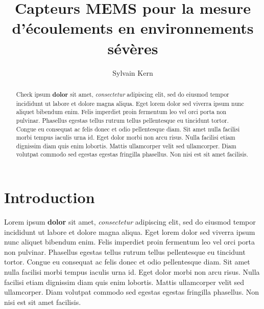 \documentclass[
]{article}
\title{Capteurs MEMS pour la mesure d'écoulements en environnements
sévères}
\author{Sylvain Kern}
\date{}
\begin{document}
\maketitle
\begin{abstract}
Check ipsum \textbf{dolor} sit amet, \emph{consectetur} adipiscing elit,
sed do eiusmod tempor incididunt ut labore et dolore magna aliqua. Eget
lorem dolor sed viverra ipsum nunc aliquet bibendum enim. Felis
imperdiet proin fermentum leo vel orci porta non pulvinar. Phasellus
egestas tellus rutrum tellus pellentesque eu tincidunt tortor. Congue eu
consequat ac felis donec et odio pellentesque diam. Sit amet nulla
facilisi morbi tempus iaculis urna id. Eget dolor morbi non arcu risus.
Nulla facilisi etiam dignissim diam quis enim lobortis. Mattis
ullamcorper velit sed ullamcorper. Diam volutpat commodo sed egestas
egestas fringilla phasellus. Non nisi est sit amet facilisis.
\end{abstract}

\section*{Introduction}\label{introduction}

Lorem ipsum \textbf{dolor} sit amet, \emph{consectetur} adipiscing elit,
sed do eiusmod tempor incididunt ut labore et dolore magna aliqua. Eget
lorem dolor sed viverra ipsum nunc aliquet bibendum enim. Felis
imperdiet proin fermentum leo vel orci porta non pulvinar. Phasellus
egestas tellus rutrum tellus pellentesque eu tincidunt tortor. Congue eu
consequat ac felis donec et odio pellentesque diam. Sit amet nulla
facilisi morbi tempus iaculis urna id. Eget dolor morbi non arcu risus.
Nulla facilisi etiam dignissim diam quis enim lobortis. Mattis
ullamcorper velit sed ullamcorper. Diam volutpat commodo sed egestas
egestas fringilla phasellus. Non nisi est sit amet facilisis.
\end{document}

